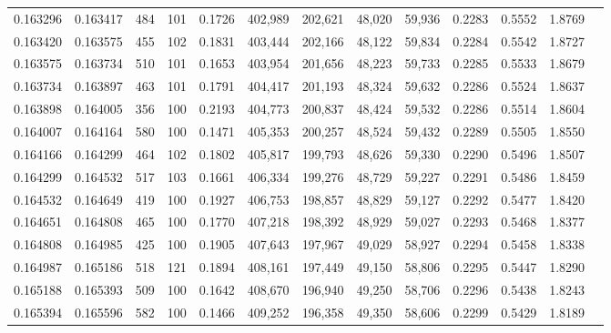 \begin{tabular}{rrrrrrrrrrrrr}
0.163296 & 0.163417 &   484 & 101 &                                     0.1726 & 402,989 & 202,621 &  48,020 &  59,936 & 0.2283 & 0.5552 & 1.8769 \\
0.163420 & 0.163575 &   455 & 102 &                                     0.1831 & 403,444 & 202,166 &  48,122 &  59,834 & 0.2284 & 0.5542 & 1.8727 \\
0.163575 & 0.163734 &   510 & 101 &                                     0.1653 & 403,954 & 201,656 &  48,223 &  59,733 & 0.2285 & 0.5533 & 1.8679 \\
0.163734 & 0.163897 &   463 & 101 &                                     0.1791 & 404,417 & 201,193 &  48,324 &  59,632 & 0.2286 & 0.5524 & 1.8637 \\
0.163898 & 0.164005 &   356 & 100 &                                     0.2193 & 404,773 & 200,837 &  48,424 &  59,532 & 0.2286 & 0.5514 & 1.8604 \\
0.164007 & 0.164164 &   580 & 100 &                                     0.1471 & 405,353 & 200,257 &  48,524 &  59,432 & 0.2289 & 0.5505 & 1.8550 \\
0.164166 & 0.164299 &   464 & 102 &                                     0.1802 & 405,817 & 199,793 &  48,626 &  59,330 & 0.2290 & 0.5496 & 1.8507 \\
0.164299 & 0.164532 &   517 & 103 &                                     0.1661 & 406,334 & 199,276 &  48,729 &  59,227 & 0.2291 & 0.5486 & 1.8459 \\
0.164532 & 0.164649 &   419 & 100 &                                     0.1927 & 406,753 & 198,857 &  48,829 &  59,127 & 0.2292 & 0.5477 & 1.8420 \\
0.164651 & 0.164808 &   465 & 100 &                                     0.1770 & 407,218 & 198,392 &  48,929 &  59,027 & 0.2293 & 0.5468 & 1.8377 \\
0.164808 & 0.164985 &   425 & 100 &                                     0.1905 & 407,643 & 197,967 &  49,029 &  58,927 & 0.2294 & 0.5458 & 1.8338 \\
0.164987 & 0.165186 &   518 & 121 &                                     0.1894 & 408,161 & 197,449 &  49,150 &  58,806 & 0.2295 & 0.5447 & 1.8290 \\
0.165188 & 0.165393 &   509 & 100 &                                     0.1642 & 408,670 & 196,940 &  49,250 &  58,706 & 0.2296 & 0.5438 & 1.8243 \\
0.165394 & 0.165596 &   582 & 100 &                                     0.1466 & 409,252 & 196,358 &  49,350 &  58,606 & 0.2299 & 0.5429 & 1.8189 \\

\end{tabular}
